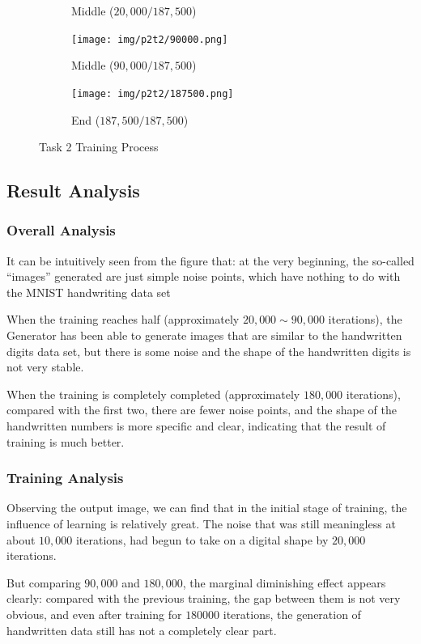 \begin{figure}[!htbp]
\begin{subfigure}[b]{0.3\textwidth}
    \caption{Middle ($20,000/187,500$)}
  \end{subfigure}
  \begin{subfigure}[b]{0.3\textwidth}
    \texttt{[image: img/p2t2/90000.png]}
    \caption{Middle ($90,000/187,500$)}
  \end{subfigure}
  \begin{subfigure}[b]{0.3\textwidth}
    \texttt{[image: img/p2t2/187500.png]}
    \caption{End ($187,500/187,500$)}
  \end{subfigure}
  \caption{Task 2 Training Process}
  \label{fig:p2t2_train}
\end{figure}

\subsection{Result Analysis}

\subsubsection{Overall Analysis}

It can be intuitively seen from the figure that: at the very beginning, the so-called ``images'' generated are just simple noise points, which have nothing to do with the MNIST handwriting data set

When the training reaches half (approximately $20,000 \sim 90,000$ iterations),
the Generator has been able to generate images that are similar to the handwritten digits data set, but there is some noise and the shape of the handwritten digits is not very stable.

When the training is completely completed (approximately $180,000$ iterations),
compared with the first two, there are fewer noise points, and the shape of the handwritten numbers is more specific and clear, indicating that the result of training is much better.

\subsubsection{Training Analysis}

Observing the output image, we can find that in the initial stage of training, the influence of learning is relatively great.
The noise that was still meaningless at about $10,000$ iterations, had begun to take on a digital shape by $20,000$ iterations.

But comparing $90,000$ and $180,000$, the marginal diminishing effect appears clearly:
compared with the previous training, the gap between them is not very obvious, and even after training for $180000$ iterations, the generation of handwritten data still has not a completely clear part.

